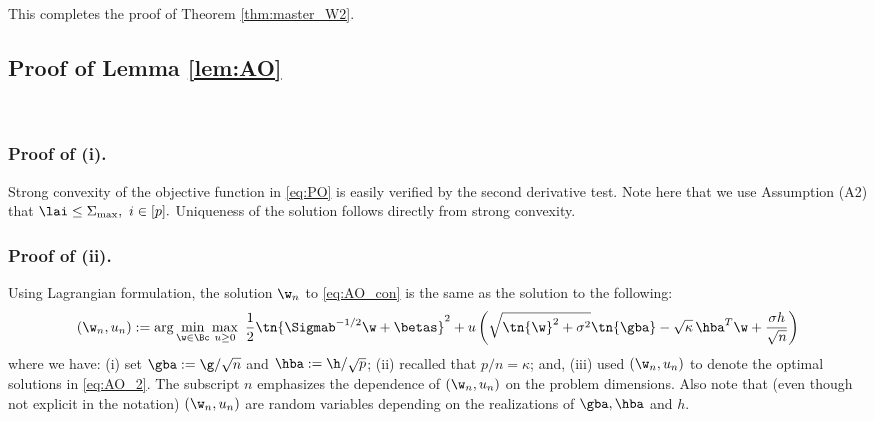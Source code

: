 This completes the proof of Theorem \ref{thm:master_W2}.

\subsection{Proof of Lemma \ref{lem:AO}}\label{sec:proofAO}

~~~~
~~~~

\vp

\subsubsection{Proof of (i).} Strong convexity of the objective function in \eqref{eq:PO} is easily verified by the second derivative test. Note here that we use Assumption (A2) that $\lai\leq\Sigma_{\max},~i\in[p].$ Uniqueness of the solution follows directly from strong convexity. 



\vspace{5pt}
\subsubsection{Proof of (ii).}Using Lagrangian formulation, the solution $\w_n$ to \eqref{eq:AO_con} is the same as the solution to the following:
\begin{align}
\left(\w_n,u_n\right) :=\arg\min_{\w\in\Bc}\max_{u\geq 0} ~\frac{1}{2}\tn{\Sigmab^{-1/2}\w+\betas}^2 + u \left( \sqrt{\tn{\w}^2+\sigma^2} \tn{\gba} - \sqrt{\kappa}\,{\hba}^T\w + \frac{\sigma h}{\sqrt{n}} \right)\label{eq:AO_2}
\end{align}
where we have: (i) set $\gba := \g/\sqrt{n}$ and $\hba:= \h/\sqrt{p}$; (ii) recalled that $p/n=\kappa$; and, (iii) used $\left(\w_n,u_n\right)$ to denote the optimal solutions in \eqref{eq:AO_2}. The subscript $n$ emphasizes the dependence of $\left(\w_n,u_n\right)$ on the problem dimensions. Also note that (even though not explicit in the notation) $\left(\w_n,u_n\right)$ are random variables depending on the realizations of $\gba,\hba$ and $h$.

